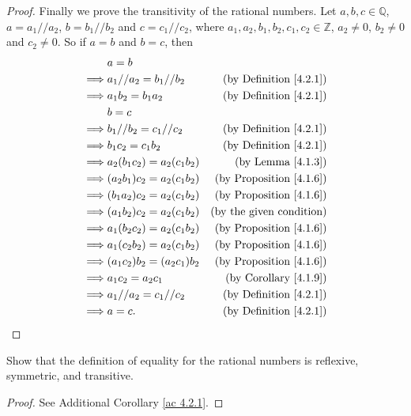 \begin{proof}
Finally we prove the transitivity of the rational numbers.
Let \(a, b, c \in \mathds{Q}\), \(a = a_1 // a_2\), \(b = b_1 // b_2\) and \(c = c_1 // c_2\), where \(a_1, a_2, b_1, b_2, c_1, c_2 \in \mathds{Z}\), \(a_2 \neq 0\), \(b_2 \neq 0\) and \(c_2 \neq 0\).
So if \(a = b\) and \(b = c\), then
\begin{align*}
& a = b \\
\implies & a_1 // a_2 = b_1 // b_2 & \text{(by Definition \ref{4.2.1})} \\
\implies & a_1b_2 = b_1a_2 & \text{(by Definition \ref{4.2.1})} \\
& b = c \\
\implies & b_1 // b_2 = c_1 // c_2 & \text{(by Definition \ref{4.2.1})} \\
\implies & b_1c_2 = c_1b_2 & \text{(by Definition \ref{4.2.1})} \\
\implies & a_2(b_1c_2) = a_2(c_1b_2) & \text{(by Lemma \ref{4.1.3})} \\
\implies & (a_2b_1)c_2 = a_2(c_1b_2) & \text{(by Proposition \ref{4.1.6})} \\
\implies & (b_1a_2)c_2 = a_2(c_1b_2) & \text{(by Proposition \ref{4.1.6})} \\
\implies & (a_1b_2)c_2 = a_2(c_1b_2) & \text{(by the given condition)} \\
\implies & a_1(b_2c_2) = a_2(c_1b_2) & \text{(by Proposition \ref{4.1.6})} \\
\implies & a_1(c_2b_2) = a_2(c_1b_2) & \text{(by Proposition \ref{4.1.6})} \\
\implies & (a_1c_2)b_2 = (a_2c_1)b_2 & \text{(by Proposition \ref{4.1.6})} \\
\implies & a_1c_2 = a_2c_1 & \text{(by Corollary \ref{4.1.9})} \\
\implies & a_1 // a_2 = c_1 // c_2 & \text{(by Definition \ref{4.2.1})} \\
\implies & a = c. & \text{(by Definition \ref{4.2.1})}
\end{align*}
\end{proof}

\exercisesection

\begin{exercise}\label{ex 4.2.1}
Show that the definition of equality for the rational numbers is reflexive, symmetric, and transitive.
\end{exercise}

\begin{proof}
See Additional Corollary \ref{ac 4.2.1}.
\end{proof}